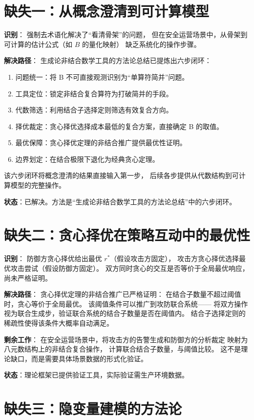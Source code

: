 \documentclass[11pt,a4paper]{article}
\begin{document}
\section{缺失一：从概念澄清到可计算模型}

\textbf{识别}：
强制去术语化解决了“看清骨架”的问题，
但在安全运营场景中，从骨架到可计算的估计公式（如 $B$ 的量化映射）
缺乏系统化的操作步骤。

\textbf{解决路径}：
生成论非结合数学工具的方法论总结已提炼出六步闭环：
\begin{enumerate}
    \item 问题统一：将 B 不可直接观测识别为“单算符简并”问题。
    \item 工具定位：锁定非结合复合算符为打破简并的手段。
    \item 代数筛选：利用结合子选择定则筛选有效复合方向。
    \item 择优裁定：贪心择优选择成本最低的复合方案，直接确定 B 的取值。
    \item 最优保障：贪心择优定理的非结合推广提供最优性证明。
    \item 边界划定：在结合极限下退化为经典贪心定理。
\end{enumerate}
该六步闭环将概念澄清的结果直接输入第一步，
后续各步提供从代数结构到可计算模型的完整操作。

\textbf{状态}：已解决。方法是“生成论非结合数学工具的方法论总结”中的六步闭环。

\section{缺失二：贪心择优在策略互动中的最优性}

\textbf{识别}：
防御方贪心择优给出最优 $r^*$（假设攻击方固定），
攻击方贪心择优选择最优攻击尝试（假设防御方固定）。
双方同时贪心的交互是否等价于全局最优响应，尚未严格证明。

\textbf{解决路径}：
贪心择优定理的非结合推广已严格证明：
在结合子数量不超过阈值时，贪心等价于全局最优。
该阈值条件可以推广到攻防联合系统——
将双方操作视为联合生成步，验证联合系统的结合子数量是否在阈值内。
结合子选择定则的稀疏性使得该条件大概率自动满足。

\textbf{剩余工作}：
在安全运营场景中，将攻击方的告警生成和防御方的分析裁定
映射为八元数结构上的非结合复合操作，
计算联合结合子数量，与阈值比较。
这不是理论缺口，而是需要具体场景数据的形式化验证。

\textbf{状态}：理论框架已提供验证工具，实际验证需生产环境数据。

\section{缺失三：隐变量建模的方法论}
\end{document}
